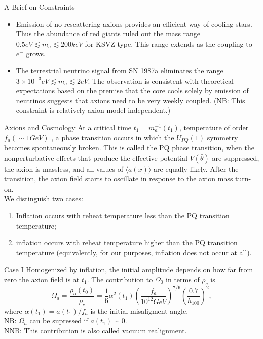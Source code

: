 \documentclass{beamer}
\begin{document}
\begin{frame}{A Brief on Constraints}
\begin{itemize}
\item Emission of no-rescattering axions provides an efficient way of cooling stars. Thus the abundance of red giants ruled out the mass range $0.5 eV \lesssim m_a \lesssim 200keV$ for KSVZ type. This range extends as the coupling to $e^-$ grows.
\item The terrestrial neutrino signal from SN 1987a eliminates the range $3 \times 10^{-3} eV \lesssim m_a \lesssim 2 eV$. The observation is consistent with theoretical expectations based on the premise that the core cools solely by emission of neutrinos suggests that axions need to be very weekly coupled. (NB: This constraint is relatively axion model independent.)
\end{itemize}
\end{frame}
\begin{frame}{Axions and Cosmology}
At a critical time $t_1 = m_a^{-1}(t_1)$, temperature of order $f_a (\sim 1 GeV)$ , a phase transition occurs in which the $U_{PQ}(1)$ symmetry becomes spontaneously broken. This is called the PQ phase transition, when the nonperturbative effects that produce the effective potential $V(\bar{\theta})$ are suppressed, the axion is massless,
and all values of $\langle a(x) \rangle$ are equally likely. After the transition, the axion field starts to oscillate in response to the axion mass turn-on.\\
We distinguish two cases:
\begin{enumerate}
\item Inflation occurs with reheat temperature less than the PQ transition temperature;
\item inflation occurs with reheat temperature higher than the PQ transition temperature (equivalently, for our purposes, inflation does not occur at all).
\end{enumerate}
\end{frame}
\begin{frame}{Case I}
Homogenized by inflation, the initial amplitude depends on how far from zero the axion field is at $t_1$. The contribution to $\Omega_0$ in terms of $\rho_c$ is$$
\Omega_a = \frac{\rho_a(t_0)}{\rho_c} = \frac{1}{6}\alpha^2(t_1)(\frac{f_a}{10^{12}GeV})^{7/6}(\frac{0.7}{h_{100}})^2,$$
where $\alpha(t_1) = a(t_1)/f_a$ is the initial misaligment angle.\\
\vspace{1cm}
NB: $\Omega_a$ can be supressed if $a(t_1) \sim 0$. \\
NNB: This contribution is also called \alert{vacuum realignment}.
\end{frame}
\end{document}
